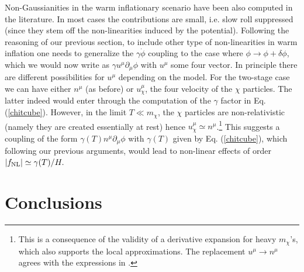 \documentclass[11pt,amsmath,floats,floatfix,nofootinbib,secnumarabic, superscriptaddress, tightenlines]{revtex4}
\begin{document}
{Non-Gaussianities in the warm inflationary scenario have been also computed in the literature. In most cases the contributions are small, i.e. slow roll
suppressed \cite{warmf1} (since they stem off the non-linearities induced by the potential). Following the reasoning of our previous section, to include
 other type of non-linearities in warm inflation one needs to generalize the $\gamma \dot\phi$ coupling to the case where $\phi \to \phi + \delta\phi$, which
we would now write as $\gamma u^\mu \partial_\mu \phi$ with $u^\mu$ some four vector. In principle there are different possibilities for $u^\mu$ depending
 on the model. For the two-stage case we can have either $n^\mu$ (as before) or $u^\mu_\chi$, the four velocity of the $\chi$ particles. The latter indeed would enter through the computation of the $\gamma$ factor in Eq. (\ref{chitcube}). However, in the limit $T \ll m_\chi$, the $\chi$ particles are non-relativistic (namely they are created essentially at rest) hence $u^\mu_\chi \simeq n^\mu$.\footnote{This is a consequence of the validity of a derivative expansion for heavy $m_\chi$'s, which also supports the local approximations. The replacement $u^\mu \to n^\mu$ agrees with the expressions in \cite{berera11}.} This suggests a coupling of the form $\gamma(T) n^\mu \partial_\mu \phi$ with $\gamma(T)$ given by Eq. (\ref{chitcube}), which following our previous arguments, would lead to non-linear effects of order $|f_{\rm NL}| \simeq \gamma(T)/H.$

\section{Conclusions}

}
\end{document}
